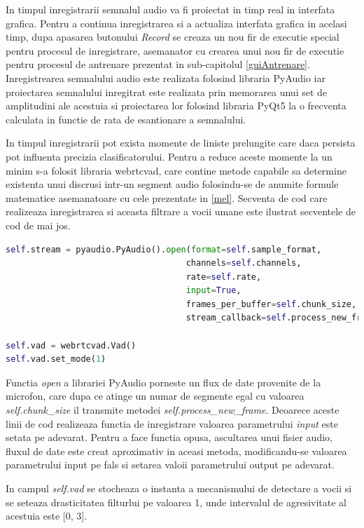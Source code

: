 \documentclass[a4paper,12pt]{book}
\begin{document}
		In timpul inregistrarii semnalul audio va fi proiectat in timp real in interfata grafica. Pentru a continua inregistrarea si a actualiza interfata grafica in acelasi timp, dupa apasarea butonului \textit{Record} se creaza un nou fir de executie special pentru procesul de inregistrare, asemanator cu crearea unui nou fir de executie pentru procesul de antrenare prezentat in sub-capitolul \ref{guiAntrenare}. Inregistrearea semnalului audio este realizata folosind libraria PyAudio iar proiectarea semnalului inregitrat este realizata prin memorarea unui set de amplitudini ale acestuia si proiectarea lor folosind libraria PyQt5 la o frecventa calculata in functie de rata de esantionare a semnalului. \par
		In timpul inregistrarii pot exista momente de liniste prelungite care daca persista pot influenta precizia clasificatorului. Pentru a reduce aceste momente la un minim s-a folosit libraria webrtcvad, care contine metode capabile sa determine existenta unui discrusi intr-un segment audio folosindu-se de anumite formule matematice asemanatoare cu cele prezentate in \ref{mel}. Secventa de cod care realizeaza inregistrarea si aceasta filtrare a vocii umane este ilustrat secventele de cod de mai jos.
		\begin{lstlisting}[language=Python, caption={Initializarea fluxului de transmitere a datelor pentru inregistrarea}]	
self.stream = pyaudio.PyAudio().open(format=self.sample_format,
									channels=self.channels,
									rate=self.rate,
									input=True,
									frames_per_buffer=self.chunk_size, 
									stream_callback=self.process_new_frame)

self.vad = webrtcvad.Vad()
self.vad.set_mode(1) \end{lstlisting}
		Functia \textit{open} a librariei PyAudio porneste un flux de date provenite de la microfon, care dupa ce atinge un numar de segmente egal cu valoarea \textit{self.chunk\_size} il transmite metodei \textit{self.process\_new\_frame}. Deoarece aceste linii de cod realizeaza functia de inregistrare valoarea parametrului \textit{input} este setata pe adevarat. Pentru a face functia opusa, ascultarea unui fisier audio, fluxul de date este creat aproximativ in aceasi metoda, modificandu-se valoarea parametrului input pe fals si setarea valoii parametrului output pe adevarat. \par
		
		In campul \textit{self.vad} se stocheaza o instanta a mecanismului de detectare a vocii si se seteaza drasticitatea filturlui pe valoarea 1, unde intervalul de agresivitate al acestuia este [0, 3]. \par
\end{document}
